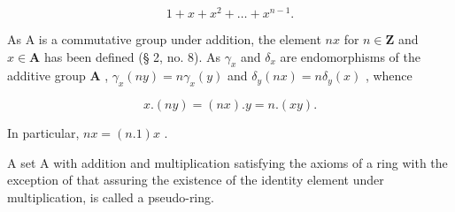\[
1 + x + x ^ {2} + \dots + x ^ {n - 1}.
\]

As A is a commutative group under addition, the element \(nx\) for \(n \in \mathbf{Z}\) and \(x \in \mathbf{A}\) has been defined (§ 2, no. 8). As \(\gamma_x\) and \(\delta_x\) are endomorphisms of the additive group \(\mathbf{A}\) , \(\gamma_x(ny) = n\gamma_x(y)\) and \(\delta_y(nx) = n\delta_y(x)\) , whence

\[
x. (n y) = (n x). y = n. (x y).
\]

In particular, \(nx = (n.1)x\) .

A set A with addition and multiplication satisfying the axioms of a ring with the exception of that assuring the existence of the identity element under multiplication, is called a pseudo-ring.

